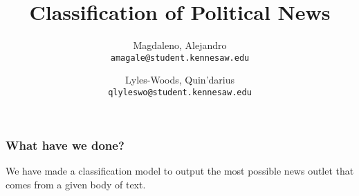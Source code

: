 \documentclass{beamer}
\title{Classification of Political News}
\author{
	Magdaleno, Alejandro\\
	\texttt{amagale@student.kennesaw.edu}
	\and
	Lyles-Woods, Quin'darius \\
	\texttt{qlyleswo@student.kennesaw.edu}
}
\institute{Kennesaw State University}
\begin{document}
\frame{\titlepage}

\begin{frame}
	\frametitle{What have we done?}
	We have made a classification model to output the most possible news outlet that comes from a given body of text. 
\end{frame}
\end{document}
